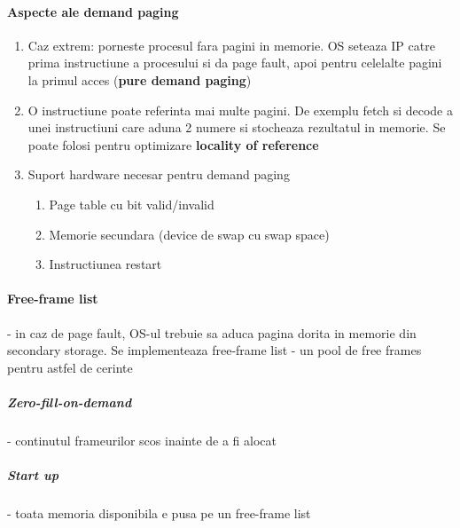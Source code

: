 \documentclass{article}
\begin{document}
\paragraph*{Aspecte ale demand paging}
\begin{enumerate}
    \item Caz extrem: porneste procesul fara pagini in memorie. OS seteaza IP catre prima instructiune a procesului si da page fault, apoi pentru celelalte pagini la primul acces (\textbf{pure demand paging})
    \item O instructiune poate referinta mai multe pagini. De exemplu fetch si decode a unei instructiuni care aduna 2 numere si stocheaza rezultatul in memorie. Se poate folosi pentru optimizare \textbf{locality of reference}
    \item Suport hardware necesar pentru demand paging
          \begin{enumerate}
              \item Page table cu bit valid/invalid
              \item Memorie secundara (device de swap cu swap space)
              \item Instructiunea restart
          \end{enumerate}
\end{enumerate}

\paragraph*{Free-frame list} - in caz de page fault, OS-ul trebuie sa aduca pagina dorita in memorie din secondary storage. Se implementeaza free-frame list - un pool de free frames pentru astfel de cerinte
\subparagraph*{Zero-fill-on-demand} - continutul frameurilor scos inainte de a fi alocat
\subparagraph*{Start up} - toata memoria disponibila e pusa pe un free-frame list
\end{document}

